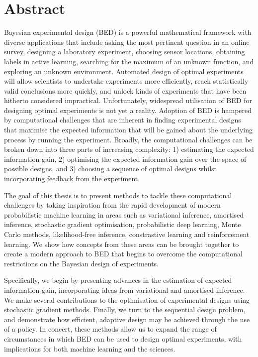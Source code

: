 \documentclass[a4paper, 10pt]{report}
\theoremstyle{plain}
\theoremstyle{definition}
\theoremstyle{remark}
\begin{document}
	
	
	
	\newpage
	\chapter*{Abstract}
	Bayesian experimental design (BED) is a powerful mathematical framework with diverse applications that include asking the most pertinent question in an online survey, designing a laboratory experiment, choosing sensor locations, obtaining labels in active learning, searching for the maximum of an unknown function, and exploring an unknown environment.
	Automated design of optimal experiments will allow scientists to undertake experiments more efficiently, reach statistically valid conclusions more quickly, and unlock kinds of experiments that have been hitherto considered impractical.
	Unfortunately, widespread utilisation of BED for designing optimal experiments is not yet a reality.
	Adoption of BED is hampered by computational challenges that are inherent in finding experimental designs that maximise the expected information that will be gained about the underlying process by running the experiment.
	Broadly, the computational challenges can be broken down into three parts of increasing complexity: 1) estimating the expected information gain, 2) optimising the expected information gain over the space of possible designs, and 3) choosing a sequence of optimal designs whilst incorporating feedback from the experiment.
	
	The goal of this thesis is to present methods to tackle these computational challenges by taking inspiration from the rapid development of modern probabilistic machine learning in areas such as variational inference, amortised inference, stochastic gradient optimisation, probabilistic deep learning, Monte Carlo methods, likelihood-free inference, constrastive learning and reinforcement learning.
	We show how concepts from these areas can be brought together to create a modern approach to BED that begins to overcome the computational restrictions on the Bayesian design of experiments.
	
	Specifically, we begin by presenting advances in the estimation of expected information gain, incorporating ideas from variational and amortised inference.
	We make several contributions to the optimisation of experimental designs using stochastic gradient methods.
	Finally, we turn to the sequential design problem, and demonstrate how efficient, adaptive design may be achieved through the use of a policy.
	In concert, these methods allow us to expand the range of circumstances in which BED can be used to design optimal experiments, with implications for both machine learning and the sciences.
\end{document}
